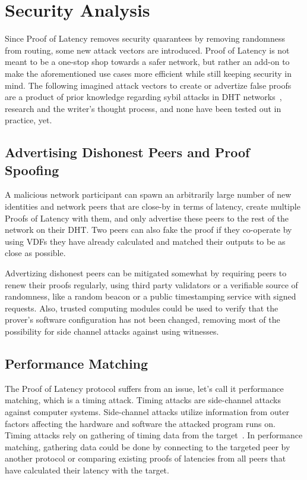 \section{Security Analysis}
Since Proof of Latency removes security quarantees by removing randomness from routing, some new attack vectors are introduced. Proof of Latency is not meant to be a one-stop shop towards a safer network, but rather an add-on to make the aforementioned use cases more efficient while still keeping security in mind. The following imagined attack vectors to create or advertize false proofs are a product of prior knowledge regarding sybil attacks in DHT networks~\cite{Urdaneta2011-oi, Al-Ameen2014-gc, Cholez2009-po, Yu2008-xl}, research and the writer's thought process, and none have been tested out in practice, yet.

\subsection{Advertising Dishonest Peers and Proof Spoofing}
A malicious network participant can spawn an arbitrarily large number of new identities and network peers that are close-by in terms of latency, create multiple Proofs of Latency with them, and only advertise these peers to the rest of the network on their DHT. Two peers can also fake the proof if they co-operate by using VDFs they have already calculated and matched their outputs to be as close as possible.

Advertizing dishonest peers can be mitigated somewhat by requiring peers to renew their proofs regularly, using third party validators or a verifiable source of randomness, like a random beacon or a public timestamping service with signed requests. Also, trusted computing modules could be used to verify that the prover's software configuration has not been changed, removing most of the possibility for side channel attacks against using witnesses.

\subsection{Performance Matching}
The Proof of Latency protocol suffers from an issue, let's call it performance matching, which is a timing attack. Timing attacks are side-channel attacks against computer systems. Side-channel attacks utilize information from outer factors affecting the hardware and software the attacked program runs on. Timing attacks rely on gathering of timing data from the target~\cite{noauthor_undated-mp}. In performance matching, gathering data could be done by connecting to the targeted peer by another protocol or comparing existing proofs of latencies from all peers that have calculated their latency with the target.

